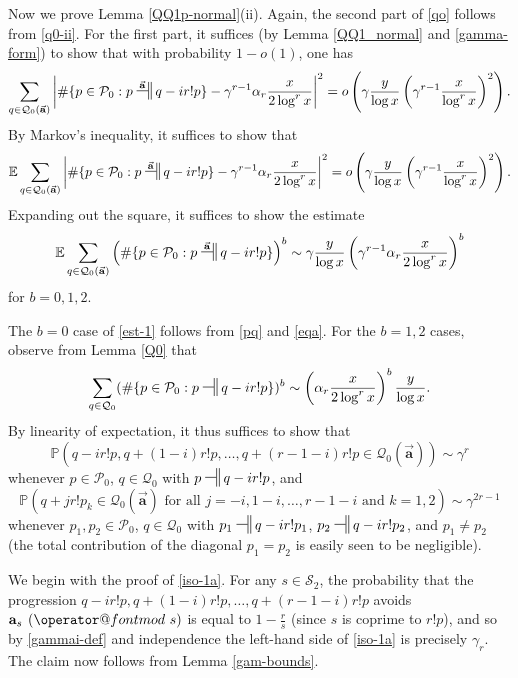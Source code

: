 \documentclass[11pt]{amsart}
\makeatletter
\numberwithin{equation}{section}  %
\theoremstyle{remark}
\theoremstyle{plain}
\numberwithin{equation}{section}
\newcommand{\E}{\mathbb{E}}  %
\newcommand{\PR}{\mathbb{P}}  %
\renewcommand{\pmod}[1]{\allowbreak\mkern7mu({\operator@font mod}\,\,#1)}
\renewcommand{\(}{\left(}
\renewcommand{\)}{\right)}
\newcommand{\asym}{\sim}   %
\newcommand{\relr}{\nsdtstile{}{}} %
\newcommand{\relra}{\nsdtstile{}{\vect{\mathbf{a}}}} %
\newcommand{\vect}[1]{{\ensuremath{\vec{#1}}}}
\newcommand{\PP}{\mathcal{P}}
\newcommand{\QQ}{\mathcal{Q}}
\newcommand{\cS}{\mathcal{S}}
\makeatother
\begin{document}
Now we prove Lemma \ref{QQ1p-normal}(ii).  Again, the second part of
\eqref{qo} follows from \eqref{q0-ii}.  For the first part, it
suffices (by Lemma \ref{QQ1_normal} and \eqref{gamma-form}) to show that with probability $1-o(1)$, one has
$$ \sum_{q \in \QQ_0(\vect{\mathbf{a}})} \left|\# \{ p \in \PP_0: p \relra q - ir! p \} - \gamma^{r-1} \alpha_r \frac{x}{2\log^r x}\right|^2 = o\left( \gamma \frac{y}{\log x} \(\gamma^{r-1} \frac{x}{\log^r x}\)^2 \right).$$
By Markov's inequality, it suffices to show that
$$ \E \sum_{q \in \QQ_0(\vect{\mathbf{a}})} \left|\# \{ p \in \PP_0: p \relra q - ir! p \} - \gamma^{r-1} \alpha_r \frac{x}{2\log^r x}\right|^2 = o\left( \gamma \frac{y}{\log x} \(\gamma^{r-1} \frac{x}{\log^r x}\)^2 \right).$$
Expanding out the square, it suffices to show the estimate
\begin{equation}\label{est-1}
\E \sum_{q \in \QQ_0(\vect{\mathbf{a}})} \(\# \{ p \in \PP_0: p \relra
q - ir! p \}\)^b  \asym  \gamma \frac{y}{\log x} \(\gamma^{r-1} \alpha_r
\frac{x}{2\log^r x}\)^b
\end{equation}
for $b=0,1,2$.

The $b=0$ case of \eqref{est-1} follows from \eqref{pq} and \eqref{eqa}.  For the $b=1,2$ cases, observe from Lemma \ref{Q0} that
$$
\sum_{q \in \QQ_0} (\# \{ p \in \PP_0: p \relr q - ir! p \})^b \asym \left(\alpha_r \frac{x}{2\log^r x}\right)^b \frac{y}{\log x}.
$$
By linearity of expectation, it thus suffices to show that
\begin{equation}\label{iso-1a}
\PR( q-ir!p, q+(1-i)r!p,\dots, q+(r-1-i)r! p \in \QQ_0(\vect{\mathbf{a}}) ) \asym \gamma^r
\end{equation}
whenever $p \in \PP_0$, $q \in \QQ_0$ with $p \relr q-ir! p$, and
\begin{equation}\label{iso-2a}
\PR( q+jr!p_k \in \QQ_0(\vect{\mathbf{a}}) \mbox{ for all }
j=-i,1-i,\ldots,r-1-i \mbox{ and } k=1,2 ) \asym \gamma^{2r-1}
\end{equation}
whenever $p_1, p_2 \in \PP_0$, $q \in \QQ_0$ with $p_1 \relr q-ir!
p_1$, $p_2 \relr q-ir! p_2$, and $p_1 \neq p_2$ (the total
contribution of the diagonal $p_1=p_2$ is easily seen to be
negligible). 

We begin with the proof of \eqref{iso-1a}.  For any $s \in \cS_2$, the probability that the progression $q-ir!p, q+(1-i)r!p,\dots, q+(r-1-i)r! p$ avoids $\mathbf{a}_s \pmod{s}$ is equal to $1-\frac{r}{s}$ (since $s$ is coprime to $r!p$), and so by \eqref{gammai-def} and independence the left-hand side of \eqref{iso-1a} is precisely $\gamma_r$.  The claim now follows from Lemma \ref{gam-bounds}.
\end{document}
